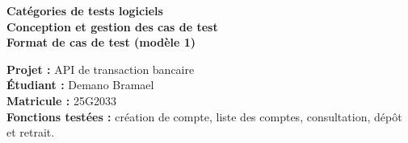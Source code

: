\documentclass[10pt,a4paper]{article}
\begin{document}
\begin{center}
    {\Large\bfseries\color{titleblue} Catégories de tests logiciels}\\[0.35cm]
    {\large\bfseries\color{sectionpink} Conception et gestion des cas de test}\\[0.2cm]
    {\large\bfseries Format de cas de test (modèle 1)}\\[0.35cm]
\end{center}

\noindent\textbf{Projet :} API de transaction bancaire\\
\textbf{Étudiant :} Demano Bramael\\
\textbf{Matricule :} 25G2033\\
\textbf{Fonctions testées :} création de compte, liste des comptes, consultation, dépôt et retrait.

\vspace{0.35cm}
\end{document}
